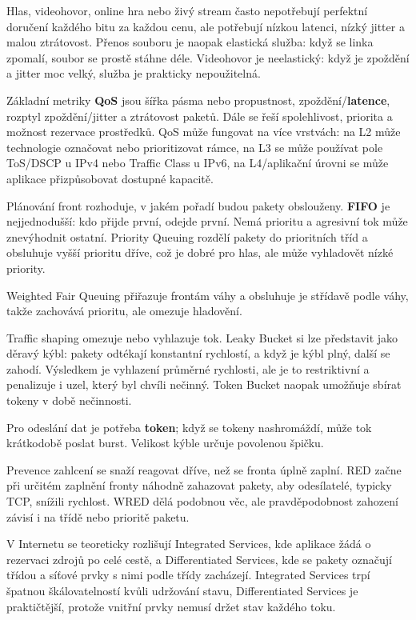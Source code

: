 Hlas, videohovor, online hra nebo živý stream často nepotřebují perfektní doručení každého bitu za každou cenu, ale potřebují nízkou latenci, nízký jitter a malou ztrátovost. Přenos souboru je naopak elastická služba: když se linka zpomalí, soubor se prostě stáhne déle. Videohovor je neelastický: když je zpoždění a jitter moc velký, služba je prakticky nepoužitelná.

Základní metriky \textbf{QoS} jsou šířka pásma nebo propustnost, zpoždění/\textbf{latence}, rozptyl zpoždění/jitter a ztrátovost paketů. Dále se řeší spolehlivost, priorita a možnost rezervace prostředků. QoS může fungovat na více vrstvách: na L2 může technologie označovat nebo prioritizovat rámce, na L3 se může používat pole ToS/DSCP u IPv4 nebo Traffic Class u IPv6, na L4/aplikační úrovni se může aplikace přizpůsobovat dostupné kapacitě.

Plánování front rozhoduje, v jakém pořadí budou pakety obslouženy. \textbf{FIFO} je nejjednodušší: kdo přijde první, odejde první. Nemá prioritu a agresivní tok může znevýhodnit ostatní. Priority Queuing rozdělí pakety do prioritních tříd a obsluhuje vyšší prioritu dříve, což je dobré pro hlas, ale může vyhladovět nízké priority.

Weighted Fair Queuing přiřazuje frontám váhy a obsluhuje je střídavě podle váhy, takže zachovává prioritu, ale omezuje hladovění.

Traffic shaping omezuje nebo vyhlazuje tok. Leaky Bucket si lze představit jako děravý kýbl: pakety odtékají konstantní rychlostí, a když je kýbl plný, další se zahodí. Výsledkem je vyhlazení průměrné rychlosti, ale je to restriktivní a penalizuje i uzel, který byl chvíli nečinný. Token Bucket naopak umožňuje sbírat tokeny v době nečinnosti.

Pro odeslání dat je potřeba \textbf{token}; když se tokeny nashromáždí, může tok krátkodobě poslat burst. Velikost kýble určuje povolenou špičku.

Prevence zahlcení se snaží reagovat dříve, než se fronta úplně zaplní. RED začne při určitém zaplnění fronty náhodně zahazovat pakety, aby odesílatelé, typicky TCP, snížili rychlost. WRED dělá podobnou věc, ale pravděpodobnost zahození závisí i na třídě nebo prioritě paketu.

V Internetu se teoreticky rozlišují Integrated Services, kde aplikace žádá o rezervaci zdrojů po celé cestě, a Differentiated Services, kde se pakety označují třídou a síťové prvky s nimi podle třídy zacházejí. Integrated Services trpí špatnou škálovatelností kvůli udržování stavu, Differentiated Services je praktičtější, protože vnitřní prvky nemusí držet stav každého toku.

